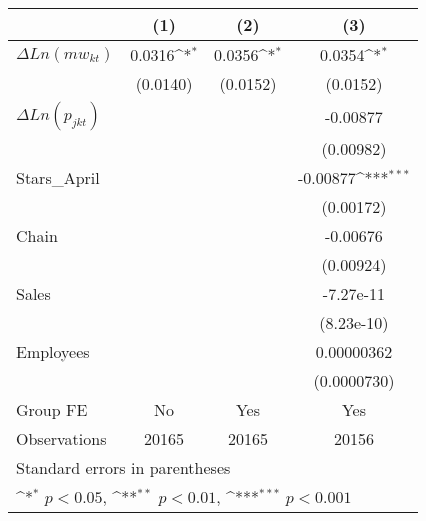{
\def\sym#1{\ifmmode^{#1}\else\(^{#1}\)\fi}
\begin{tabular}{l*{3}{c}}
\hline\hline
                    &\multicolumn{1}{c}{(1)}&\multicolumn{1}{c}{(2)}&\multicolumn{1}{c}{(3)}\\
\hline
$\Delta Ln(mw_{kt}) $&      0.0316\sym{*}  &      0.0356\sym{*}  &      0.0354\sym{*}  \\
                    &    (0.0140)         &    (0.0152)         &    (0.0152)         \\
[1em]
$\Delta Ln(p_{jkt}) $     &                     &                     &    -0.00877         \\
                    &                     &                     &   (0.00982)         \\
[1em]
Stars\_April         &                     &                     &    -0.00877\sym{***}\\
                    &                     &                     &   (0.00172)         \\
[1em]
Chain               &                     &                     &    -0.00676         \\
                    &                     &                     &   (0.00924)         \\
[1em]
Sales               &                     &                     &   -7.27e-11         \\
                    &                     &                     &  (8.23e-10)         \\
[1em]
Employees           &                     &                     &  0.00000362         \\
                    &                     &                     & (0.0000730)         \\
\hline
Group FE        &       No         &       Yes         &       Yes         \\
Observations        &       20165         &       20165         &       20156         \\
\hline\hline
\multicolumn{4}{l}{\footnotesize Standard errors in parentheses}\\
\multicolumn{4}{l}{\footnotesize \sym{*} \(p<0.05\), \sym{**} \(p<0.01\), \sym{***} \(p<0.001\)}\\
\end{tabular}
}
